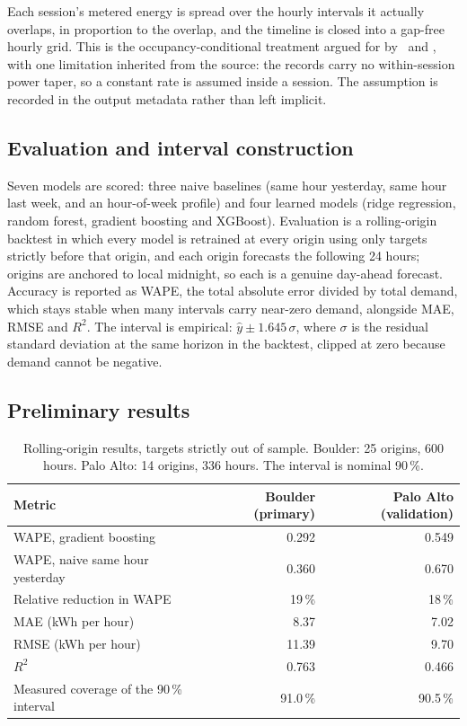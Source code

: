 \documentclass[10pt,a4paper]{article}
\begin{document}
Each session's metered energy is spread over the hourly intervals it actually overlaps, in
proportion to the overlap, and the timeline is closed into a gap-free hourly grid. This is the
occupancy-conditional treatment argued for by~\cite{Yi2018ResidentialLoadProfileGeneration} and
\cite{Uimonen2020OfficeBuildingOccupancy}, with one limitation inherited from the source: the
records carry no within-session power taper, so a constant rate is assumed inside a session. The
assumption is recorded in the output metadata rather than left implicit.

\subsection{Evaluation and interval construction}

Seven models are scored: three naive baselines (same hour yesterday, same hour last week, and an
hour-of-week profile) and four learned models (ridge regression, random forest, gradient boosting
and XGBoost). Evaluation is a rolling-origin backtest in which every model is retrained at every
origin using only targets strictly before that origin, and each origin forecasts the following
24 hours; origins are anchored to local midnight, so each is a genuine day-ahead forecast. Accuracy
is reported as WAPE, the total absolute error divided by total demand, which stays stable when many
intervals carry near-zero demand, alongside MAE, RMSE and $R^2$. The interval is empirical:
$\hat{y} \pm 1.645\,\sigma$, where $\sigma$ is the residual standard deviation at the same horizon
in the backtest, clipped at zero because demand cannot be negative.

\subsection{Preliminary results}

\begin{table}[H]
\centering
\caption{Rolling-origin results, targets strictly out of sample. Boulder: 25 origins, 600 hours.
Palo Alto: 14 origins, 336 hours. The interval is nominal 90\,\%.}
\label{tab:results}
\small
\renewcommand{\arraystretch}{1.15}
\begin{tabular}{@{}lrr@{}}
\toprule
Metric & Boulder (primary) & Palo Alto (validation) \\
\midrule
WAPE, gradient boosting & 0.292 & 0.549 \\
WAPE, naive same hour yesterday & 0.360 & 0.670 \\
Relative reduction in WAPE & 19\,\% & 18\,\% \\
MAE (kWh per hour) & 8.37 & 7.02 \\
RMSE (kWh per hour) & 11.39 & 9.70 \\
$R^2$ & 0.763 & 0.466 \\
Measured coverage of the 90\,\% interval & 91.0\,\% & 90.5\,\% \\
\bottomrule
\end{tabular}
\end{table}
\end{document}
